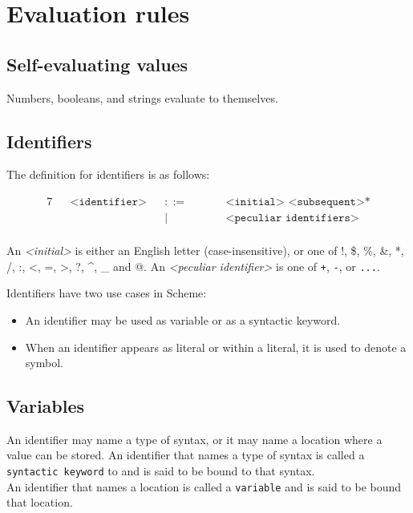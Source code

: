 \documentclass{article}
\begin{document}
\newpage

\section{Evaluation rules}

\subsection*{Self-evaluating values}
Numbers, booleans, and strings evaluate to themselves.

\subsection*{Identifiers}
The definition for identifiers is as follows:

\begin{alignat*}{7}
&& \texttt{<identifier>}    &&::= &\quad && \texttt{<initial> <subsequent>*}\\
&&                       && |   &\quad && \texttt{<peculiar identifiers>}  \\[1mm]
\end{alignat*}

An \emph{<initial>} is either an English letter (case-insensitive), or one of !, \$, \%, \&, *, /, :, <, =, >, ?, \^{}, \_ and @.
An \emph{<peculiar identifier>} is one of \texttt{+}, \texttt{-}, or \texttt{...}.

Identifiers have two use cases in Scheme:

\begin{itemize}
\item An identifier may be used as variable or as a syntactic keyword.
\item When an identifier appears as literal or within a literal, it is used to denote a symbol.
\end{itemize}

\subsection*{Variables}
An identifier may name a type of syntax, or it may name a location where a value can be stored. An identifier that names a type of syntax is called a \texttt{syntactic keyword} to and is said to be bound to that syntax.\\
An identifier that names a location is called a \texttt{variable} and is said to be bound that location.
\end{document}
